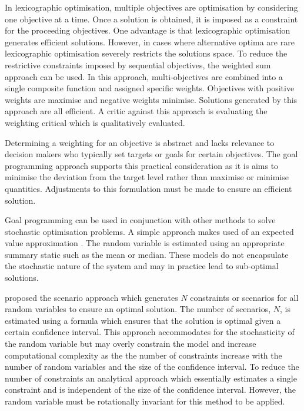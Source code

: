 \documentclass[a4paper,11pt]{article}
\begin{document}
In lexicographic optimisation, multiple objectives are optimisation by considering one objective at a time. Once a solution is obtained, it is imposed as a constraint for the proceeding objectives. One advantage is that lexicographic optimisation generates efficient solutions. However, in cases where alternative optima are rare lexicographic optimisation severely restricts the solutions space. 
To reduce the restrictive constraints imposed by sequential objectives, the weighted sum approach can be used. In this approach, multi-objectives are combined into a single composite function and assigned specific weights. Objectives with positive weights are maximise and negative weights minimise. Solutions generated by this approach are all efficient. A critic against this approach is evaluating the weighting critical which is qualitatively evaluated.

Determining a weighting for an objective is abstract and lacks relevance to decision makers who typically set targets or goals for certain objectives. The goal programming approach supports this practical consideration as it is aims to minimise the deviation from the target level rather than maximise or minimise quantities. Adjustments to this formulation must be made to ensure an efficient solution.

Goal programming can be used in conjunction with other methods to solve stochastic optimisation problems. A simple approach makes used of an expected value approximation \citep{kall1994stochastic}. The random variable is estimated using an appropriate summary static such as the mean or median. These models do not encapsulate the stochastic nature of the system and may in practice lead to sub-optimal solutions.

\cite{nemirovski2006scenario} proposed the scenario approach which generates $N$ constraints or scenarios for all random variables to ensure an optimal solution. The number of scenarios, $N$, is estimated using a formula which ensures that the solution is optimal given a certain confidence interval. This approach accommodates for the stochasticity of the random variable but may overly constrain the model and increase computational complexity as the the number of constraints increase with the number of random variables and the size of the confidence interval. To reduce the number of constraints an analytical approach which essentially estimates a single constraint and is independent of the size of the confidence interval. However, the random variable must be rotationally invariant for this method to be applied.
\end{document}
